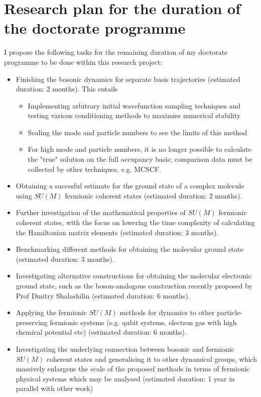 \documentclass[12pt]{report}
\begin{document}
	\section{Research plan for the duration of the doctorate programme}
	I propose the following tasks for the remaining duration of my doctorate programme to be done within this research project:
	\begin{itemize}
	\item Finishing the bosonic dynamics for separate basis trajectories (estimated duration: 2 months). This entails
		\begin{itemize}
		\item Implementing arbitrary initial wavefunction sampling techniques and testing various conditioning methods to maximise numerical stability
		\item Scaling the mode and particle numbers to see the limits of this method
		\item For high mode and particle numbers, it is no longer possible to calculate the "true" solution on the full occupancy basis; comparison data must be collected by other techniques, e.g. MCSCF.
		\end{itemize}
	\item Obtaining a succesful estimate for the ground state of a complex molecule using $SU(M)$ fermionic coherent states (estimated duration: 2 months).
	\item Further investigation of the mathematical properties of $SU(M)$ fermionic coherent states, with the focus on lowering the time complexity of calculating the Hamiltonian matrix elements (estimated duration: 3 months).
	\item Benchmarking different methods for obtaining the molecular ground state (estimated duration: 3 months).
	\item Investigating alternative constructions for obtaining the molecular electronic ground state, such as the boson-analogous construction recently proposed by Prof Dmitry Shalashilin (estimated duration: 6 months).
	\item Applying the fermionic $SU(M)$ methods for dynamics to other particle-preserving fermionic systems (e.g. qubit systems, electron gas with high chemical potential etc) (estimated duration: 6 months).
	\item Investigating the underlying connection between bosonic and fermionic $SU(M)$ coherent states and generalising it to other dynamical groups, which massively enlargens the scale of the proposed methods in terms of fermionic physical systems which may be analysed (estimated duration: 1 year in parallel with other work)
	\end{itemize}
	
\end{document}
